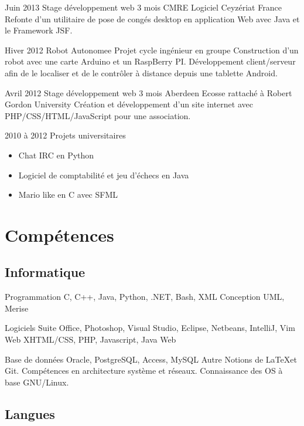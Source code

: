 \documentclass[10pt,a4paper]{moderncv}
\begin{document}
\cventry
	{Juin 2013}
	{Stage développement web}
	{3 mois}
	{CMRE Logiciel}
	{Ceyzériat France}
	{Refonte d'un utilitaire de pose de congés desktop en application Web avec Java et le Framework JSF.}

\cventry
	{Hiver 2012}
	{Robot Autonomee}
	{}
	{}
	{Projet cycle ingénieur en groupe}
	{Construction d'un robot avec une carte Arduino et un RaspBerry PI. Développement client/serveur afin de le localiser et de le contrôler à distance depuis une tablette Android.}

\cventry
	{Avril 2012}
	{Stage développement web}
	{3 mois}
	{Aberdeen Ecosse}
	{rattaché à Robert Gordon University}
	{Création et développement d'un site internet avec PHP/CSS/HTML/JavaScript pour une association.}

\cventry
	{2010 à 2012}
	{Projets universitaires}
	{}
	{}
	{}
	{
		\begin{itemize}
			\item Chat IRC en Python
			\item Logiciel de comptabilité et jeu d'échecs en Java
			\item Mario like en C avec SFML
		\end{itemize}
	}


\section{Compétences}

\subsection{Informatique}

\cvcomputer
	{Programmation}
	{C, C++, Java, Python, .NET, Bash, XML}
	{Conception}
	{UML, Merise}

\cvcomputer
	{Logiciels}
	{Suite Office, Photoshop, Visual Studio, Eclipse, Netbeans, IntelliJ, Vim}
	{Web}
	{XHTML/CSS, PHP, Javascript, Java Web}

\cvcomputer
	{Base de données}
	{Oracle, PostgreSQL, Access, MySQL}
	{Autre}
	{Notions de \LaTeX et Git. Compétences en architecture système et réseaux. Connaissance des OS à base GNU/Linux.}

\subsection{Langues}
\end{document}

